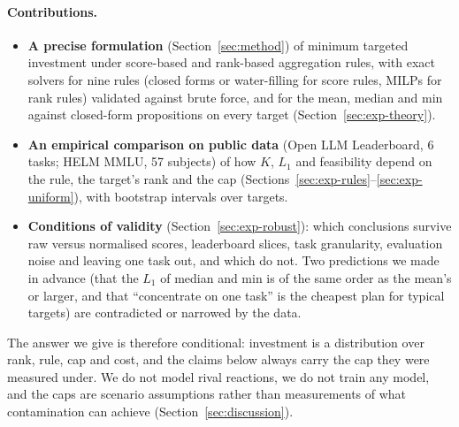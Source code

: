 \paragraph{Contributions.}
\begin{itemize}
\item \textbf{A precise formulation} (Section~\ref{sec:method}) of minimum targeted investment under score-based and rank-based aggregation rules, with exact solvers for nine rules (closed forms or water-filling for score rules, MILPs for rank rules) validated against brute force, and for the mean, median and min against closed-form propositions on every target (Section~\ref{sec:exp-theory}).
\item \textbf{An empirical comparison on public data} (Open LLM Leaderboard, 6 tasks; HELM MMLU, 57 subjects) of how $K$, $L_1$ and feasibility depend on the rule, the target's rank and the cap (Sections~\ref{sec:exp-rules}--\ref{sec:exp-uniform}), with bootstrap intervals over targets.
\item \textbf{Conditions of validity} (Section~\ref{sec:exp-robust}): which conclusions survive raw versus normalised scores, leaderboard slices, task granularity, evaluation noise and leaving one task out, and which do not. Two predictions we made in advance (that the $L_1$ of median and min is of the same order as the mean's or larger, and that ``concentrate on one task'' is the cheapest plan for typical targets) are contradicted or narrowed by the data.
\end{itemize}
The answer we give is therefore conditional: investment is a distribution over rank, rule, cap and cost, and the claims below always carry the cap they were measured under.
We do not model rival reactions, we do not train any model, and the caps are scenario assumptions rather than measurements of what contamination can achieve (Section~\ref{sec:discussion}).

